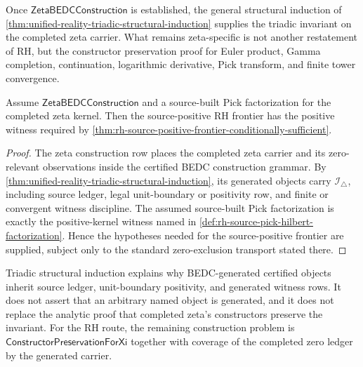 \begin{principle}
\label{prin:unified-reality-zeta-constructor-preservation-target}
Once $\mathsf{ZetaBEDCConstruction}$ is established, the general
structural induction of
\autoref{thm:unified-reality-triadic-structural-induction} supplies the
triadic invariant on the completed zeta carrier. What remains
zeta-specific is not another restatement of RH, but the constructor
preservation proof for Euler product, Gamma completion, continuation,
logarithmic derivative, Pick transform, and finite tower convergence.
\end{principle}

\begin{theorem}
\label{thm:unified-reality-zeta-bedc-construction-feeds-source-positive-frontier}
Assume $\mathsf{ZetaBEDCConstruction}$ and a source-built Pick
factorization for the completed zeta kernel. Then the source-positive RH
frontier has the positive witness required by
\autoref{thm:rh-source-positive-frontier-conditionally-sufficient}.
\end{theorem}

\begin{proof}
The zeta construction row places the completed zeta carrier and its
zero-relevant observations inside the certified BEDC construction
grammar. By
\autoref{thm:unified-reality-triadic-structural-induction}, its generated
objects carry $\mathcal I_{\triangle}$, including source ledger, legal
unit-boundary or positivity row, and finite or convergent witness
discipline. The assumed source-built Pick factorization is exactly the
positive-kernel witness named in
\autoref{def:rh-source-pick-hilbert-factorization}. Hence the hypotheses
needed for the source-positive frontier are supplied, subject only to
the standard zero-exclusion transport stated there.
\end{proof}

\begin{principle}
\label{prin:unified-reality-triadic-structural-induction-status}
Triadic structural induction explains why BEDC-generated certified
objects inherit source ledger, unit-boundary positivity, and generated
witness rows. It does not assert that an arbitrary named object is
generated, and it does not replace the analytic proof that completed
zeta's constructors preserve the invariant. For the RH route, the
remaining construction problem is
$\mathsf{ConstructorPreservationForXi}$ together with coverage of the
completed zero ledger by the generated carrier.
\end{principle}
